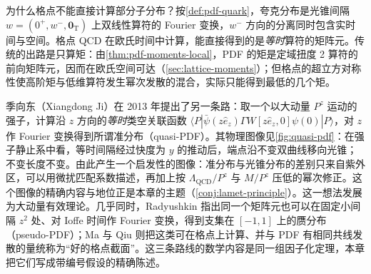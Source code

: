 为什么格点不能直接计算部分子分布？按\cref{def:pdf-quark}，夸克分布是光锥间隔 $w=(0^+,w^-,\mathbf 0_{\mathrm T})$ 上双线性算符的 Fourier 变换，$w^-$ 方向的分离同时包含实时间与空间。格点 QCD 在欧氏时间中计算，能直接得到的是\emph{等时}算符的矩阵元。传统的出路是只算矩：由\cref{thm:pdf-moments-local}，PDF 的矩是定域扭度 2 算符的前向矩阵元，因而在欧氏空间可达（\cref{sec:lattice-moments}）；但格点的超立方对称性使高阶矩与低维算符发生幂次发散的混合，实际只能得到最低的几个矩。

季向东（Xiangdong Ji）在 2013 年提出了另一条路\cite{Ji2013}：取一个以大动量 $P^z$ 运动的强子，计算沿 $z$ 方向的\emph{等时}类空关联函数 $\langle P|\bar\psi(z\hat e_z)\Gamma W[z\hat e_z,0]\psi(0)|P\rangle$，对 $z$ 作 Fourier 变换得到所谓准分布（quasi-PDF）。其物理图像见\cref{fig:quasi-pdf}：在强子静止系中看，等时间隔经过快度为 $y$ 的推动后，端点沿不变双曲线移向光锥；不变长度不变。由此产生一个启发性的图像：准分布与光锥分布的差别只来自紫外区，可以用微扰匹配系数描述，再加上按 $\Lambda_{\mathrm{QCD}}/P^z$ 与 $M/P^z$ 压低的幂次修正。这个图像的精确内容与地位正是本章的主题（\cref{conj:lamet-principle}）。这一想法发展为大动量有效理论\cite{Ji:2014gla,JiEtAl2021}。几乎同时，Radyushkin 指出同一个矩阵元也可以在固定小间隔 $z^2$ 处、对 Ioffe 时间作 Fourier 变换，得到支集在 $[-1,1]$ 上的赝分布（pseudo-PDF）\cite{Radyushkin2017}；Ma 与 Qiu 则把这类可在格点上计算、并与 PDF 有相同共线发散的量统称为“好的格点截面”\cite{Ma:2014jla,MaQiu2018}。这三条路线的数学内容是同一组因子化定理，本章把它们写成带编号假设的精确陈述。

